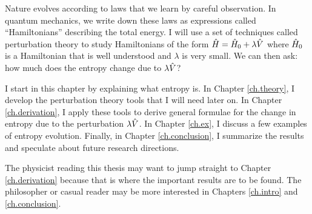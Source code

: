 
Nature evolves according to laws that we learn by careful observation. In quantum mechanics, we write down these laws as expressions called ``Hamiltonians'' describing the total energy. I will use a set of techniques called perturbation theory to study Hamiltonians of the form \(\hat{H} = \hat{H}_0 + \lambda \hat{V}\) where \(\hat{H}_0\) is a Hamiltonian that is well understood and \(\lambda\) is very small. We can then ask: how much does the entropy change due to \(\lambda \hat{V}\)?

I start in this chapter by explaining what entropy is. In Chapter \ref{ch.theory}, I develop the perturbation theory tools that I will need later on. In Chapter \ref{ch.derivation}, I apply these tools to derive general formulae for the change in entropy due to the perturbation \(\lambda \hat{V}\). In Chapter \ref{ch.ex}, I discuss a few examples of entropy evolution. Finally, in Chapter \ref{ch.conclusion}, I summarize the results and speculate about future research directions.

The physicist reading this thesis may want to jump straight to Chapter \ref{ch.derivation} because that is where the important results are to be found. The philosopher or casual reader may be more interested in Chapters \ref{ch.intro} and \ref{ch.conclusion}.
